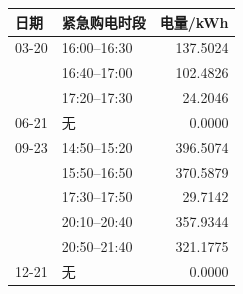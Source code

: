 \begin{tabular}{llr}
\toprule
日期 & 紧急购电时段 & 电量/kWh \\
\midrule
03-20 & 16:00--16:30 & 137.5024 \\
 & 16:40--17:00 & 102.4826 \\
 & 17:20--17:30 & 24.2046 \\
06-21 & 无 & 0.0000 \\
09-23 & 14:50--15:20 & 396.5074 \\
 & 15:50--16:50 & 370.5879 \\
 & 17:30--17:50 & 29.7142 \\
 & 20:10--20:40 & 357.9344 \\
 & 20:50--21:40 & 321.1775 \\
12-21 & 无 & 0.0000 \\
\bottomrule
\end{tabular}